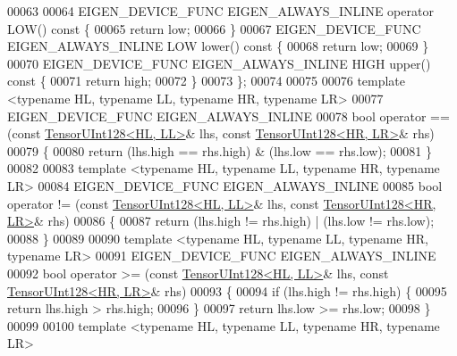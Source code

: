 \begin{DoxyCode}
00063 
00064   EIGEN\_DEVICE\_FUNC EIGEN\_ALWAYS\_INLINE \textcolor{keyword}{operator} LOW()\textcolor{keyword}{ const }\{
00065     \textcolor{keywordflow}{return} low;
00066   \}
00067   EIGEN\_DEVICE\_FUNC EIGEN\_ALWAYS\_INLINE LOW lower()\textcolor{keyword}{ const }\{
00068     \textcolor{keywordflow}{return} low;
00069   \}
00070   EIGEN\_DEVICE\_FUNC EIGEN\_ALWAYS\_INLINE HIGH upper()\textcolor{keyword}{ const }\{
00071     \textcolor{keywordflow}{return} high;
00072   \}
00073 \};
00074 
00075 
00076 \textcolor{keyword}{template} <\textcolor{keyword}{typename} HL, \textcolor{keyword}{typename} LL, \textcolor{keyword}{typename} HR, \textcolor{keyword}{typename} LR>
00077 EIGEN\_DEVICE\_FUNC EIGEN\_ALWAYS\_INLINE
00078 \textcolor{keywordtype}{bool} operator == (\textcolor{keyword}{const} \hyperlink{struct_eigen_1_1internal_1_1_tensor_u_int128}{TensorUInt128<HL, LL>}& lhs, \textcolor{keyword}{const} 
      \hyperlink{struct_eigen_1_1internal_1_1_tensor_u_int128}{TensorUInt128<HR, LR>}& rhs)
00079 \{
00080   \textcolor{keywordflow}{return} (lhs.high == rhs.high) & (lhs.low == rhs.low);
00081 \}
00082 
00083 \textcolor{keyword}{template} <\textcolor{keyword}{typename} HL, \textcolor{keyword}{typename} LL, \textcolor{keyword}{typename} HR, \textcolor{keyword}{typename} LR>
00084 EIGEN\_DEVICE\_FUNC EIGEN\_ALWAYS\_INLINE
00085 \textcolor{keywordtype}{bool} operator != (\textcolor{keyword}{const} \hyperlink{struct_eigen_1_1internal_1_1_tensor_u_int128}{TensorUInt128<HL, LL>}& lhs, \textcolor{keyword}{const} 
      \hyperlink{struct_eigen_1_1internal_1_1_tensor_u_int128}{TensorUInt128<HR, LR>}& rhs)
00086 \{
00087   \textcolor{keywordflow}{return} (lhs.high != rhs.high) | (lhs.low != rhs.low);
00088 \}
00089 
00090 \textcolor{keyword}{template} <\textcolor{keyword}{typename} HL, \textcolor{keyword}{typename} LL, \textcolor{keyword}{typename} HR, \textcolor{keyword}{typename} LR>
00091 EIGEN\_DEVICE\_FUNC EIGEN\_ALWAYS\_INLINE
00092 \textcolor{keywordtype}{bool} operator >= (\textcolor{keyword}{const} \hyperlink{struct_eigen_1_1internal_1_1_tensor_u_int128}{TensorUInt128<HL, LL>}& lhs, \textcolor{keyword}{const} 
      \hyperlink{struct_eigen_1_1internal_1_1_tensor_u_int128}{TensorUInt128<HR, LR>}& rhs)
00093 \{
00094   \textcolor{keywordflow}{if} (lhs.high != rhs.high) \{
00095     \textcolor{keywordflow}{return} lhs.high > rhs.high;
00096   \}
00097   \textcolor{keywordflow}{return} lhs.low >= rhs.low;
00098 \}
00099 
00100 \textcolor{keyword}{template} <\textcolor{keyword}{typename} HL, \textcolor{keyword}{typename} LL, \textcolor{keyword}{typename} HR, \textcolor{keyword}{typename} LR>

\end{DoxyCode}
